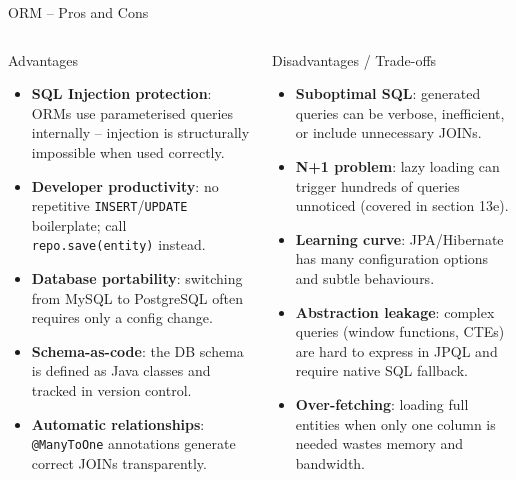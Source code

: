 \begin{frame}{ORM -- Pros and Cons}
  \begin{columns}[T]
      \begin{block}{Advantages}
        \begin{itemize}
          \item \textbf{SQL Injection protection}: ORMs use parameterised
                queries internally -- injection is structurally impossible
                when used correctly.
          \item \textbf{Developer productivity}: no repetitive
                \texttt{INSERT}/\texttt{UPDATE} boilerplate; call
                \texttt{repo.save(entity)} instead.
          \item \textbf{Database portability}: switching from MySQL to
                PostgreSQL often requires only a config change.
          \item \textbf{Schema-as-code}: the DB schema is defined as Java
                classes and tracked in version control.
          \item \textbf{Automatic relationships}: \texttt{@ManyToOne}
                annotations generate correct JOINs transparently.
        \end{itemize}
      \end{block}

      \begin{alertblock}{Disadvantages / Trade-offs}
        \begin{itemize}
          \item \textbf{Suboptimal SQL}: generated queries can be verbose,
                inefficient, or include unnecessary JOINs.
          \item \textbf{N+1 problem}: lazy loading can trigger hundreds
                of queries unnoticed (covered in section 13e).
          \item \textbf{Learning curve}: JPA/Hibernate has many
                configuration options and subtle behaviours.
          \item \textbf{Abstraction leakage}: complex queries (window
                functions, CTEs) are hard to express in JPQL and
                require native SQL fallback.
          \item \textbf{Over-fetching}: loading full entities when only
                one column is needed wastes memory and bandwidth.
        \end{itemize}
      \end{alertblock}
  \end{columns}
\end{frame}

